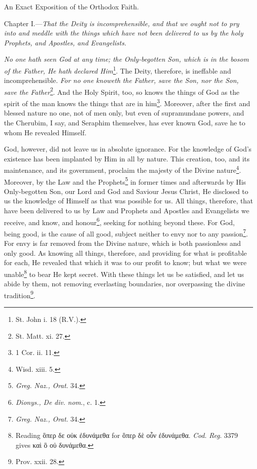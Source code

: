 

An Exact Exposition of the Orthodox Faith.

Chapter I.—\emph{That the Deity is incomprehensible, and that we ought not to pry into and meddle with the things which have not been delivered to us by the holy Prophets, and Apostles, and Evangelists.}

\emph{No one hath seen God at any time; the Only-begotten Son, which is in the bosom of the Father, He hath declared Him}\footnote{St. John i. 18 (R.V.).}. The Deity, therefore, is ineffable and incomprehensible. \emph{For no one knoweth the Father, save the Son, nor the Son, save the Father}\footnote{St. Matt. xi. 27.}. And the Holy Spirit, too, so knows the things of God as the spirit of the man knows the things that are in him\footnote{1 Cor. ii. 11.}. Moreover, after the first and blessed nature no one, not of men only, but even of supramundane powers, and the Cherubim, I say, and Seraphim themselves, has ever known God, save he to whom He revealed Himself.

God, however, did not leave us in absolute ignorance. For the knowledge of God’s existence has been implanted by Him in all by nature. This creation, too, and its maintenance, and its government, proclaim the majesty of the Divine nature\footnote{Wisd. xiii. 5.}. Moreover, by the Law and the Prophets\footnote{\emph{Greg. Naz., Orat}. 34.} in former times and afterwards by His Only-begotten Son, our Lord and God and Saviour Jesus Christ, He disclosed to us the knowledge of Himself as that was possible for us. All things, therefore, that have been delivered to us by Law and Prophets and Apostles and Evangelists we receive, and know, and honour\footnote{\emph{Dionys., De div. nom}., c. 1.}, seeking for nothing beyond these. For God, being good, is the cause of all good, subject neither to envy nor to any passion\footnote{\emph{Greg. Naz., Orat}. 34.}. For envy is far removed from the Divine nature, which is both passionless and only good. As knowing all things, therefore, and providing for what is profitable for each, He revealed that which it was to our profit to know; but what we were unable\footnote{Reading \textgreek{ὃπερ δε οὐκ ἐδυνάμεθα} for \textgreek{ὃπερ δὲ οὖν ἐδυνάμεθα}. \emph{Cod. Reg}. 3379 gives \textgreek{καὶ ὃ οὐ δυνάμεθα}.} to bear He kept secret. With these things let us be satisfied, and let us abide by them, not removing everlasting boundaries, nor overpassing the divine tradition\footnote{Prov. xxii. 28.}.

